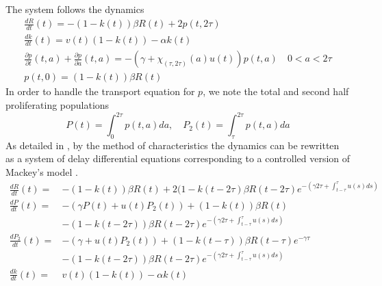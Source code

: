 \documentclass[a4paper]{article}
\begin{document}
\noindent The system follows the dynamics
$$
\begin{array}{l}
\frac{dR}{dt}(t) = -(1-k(t)) \beta R(t) + 2p(t,2\tau)\\
\frac{dk}{dt}(t) = v(t) (1-k(t)) - \alpha k(t)\\
\frac{\partial p}{\partial t}(t,a) + \frac{\partial p}{\partial a}(t,a) = -(\gamma + \chi_{(\tau,2\tau)}(a)u(t)) p(t,a) \quad 0<a<2\tau\\
p(t,0) = (1-k(t)) \beta R(t)
\end{array}
$$
In order to handle the transport equation for $p$, we note the total and second half proliferating populations
$$
P(t) = \int_0^{2\tau} p(t,a)da, \quad P_2(t) = \int_\tau^{2\tau} p(t,a)da
$$
As detailed in \cite{Dupuis14,Adimy08}, by the method of characteristics the dynamics can be rewritten as a system of delay differential equations 
corresponding to a controlled version of Mackey's model \cite{Mackey78}.
$$
\begin{array}{ll}
\frac{dR}{dt}(t) = & -(1-k(t)) \beta R(t) + 2(1-k(t-2\tau)\beta R(t-2\tau)e^{-(\gamma 2 \tau + \int_{t-\tau}^\tau u(s) ds)}\\
\frac{dP}{dt}(t) = & -(\gamma P(t) + u(t)P_2(t)) + (1-k(t))\beta R(t) \\ 
& - (1-k(t-2\tau))\beta R(t-2\tau) e^{-(\gamma 2 \tau + \int_{t-\tau}^\tau u(s) ds)}\\
\frac{dP_2}{dt}(t) = & -(\gamma + u(t)P_2(t)) + (1-k(t-\tau))\beta R(t-\tau)e^{-\gamma \tau}\\
& - (1-k(t-2\tau))\beta R(t-2\tau) e^{-(\gamma 2 \tau + \int_{t-\tau}^\tau u(s) ds)}\\
\frac{dk}{dt}(t) = & v(t) (1-k(t)) - \alpha k(t)
\end{array}
$$
\end{document}
